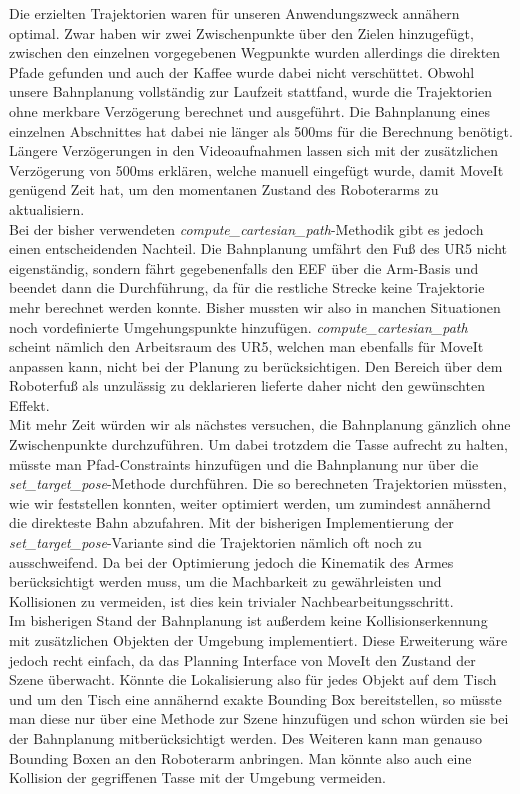 Die erzielten Trajektorien waren für unseren Anwendungszweck annähern optimal. Zwar haben wir zwei Zwischenpunkte über den Zielen hinzugefügt, zwischen den einzelnen vorgegebenen Wegpunkte wurden allerdings die direkten Pfade gefunden und auch der Kaffee wurde dabei nicht verschüttet.
\newline
Obwohl unsere Bahnplanung vollständig zur Laufzeit stattfand, wurde die Trajektorien ohne merkbare Verzögerung berechnet und ausgeführt. Die Bahnplanung eines einzelnen Abschnittes hat dabei nie länger als 500ms für die Berechnung benötigt. Längere Verzögerungen in den Videoaufnahmen lassen sich mit der zusätzlichen Verzögerung von 500ms erklären, welche manuell eingefügt wurde, damit MoveIt genügend Zeit hat, um den momentanen Zustand des Roboterarms zu aktualisiern.
\newline \\
Bei der bisher verwendeten \textit{compute\_cartesian\_path}-Methodik gibt es jedoch einen entscheidenden Nachteil. Die Bahnplanung umfährt den Fuß des UR5 nicht eigenständig, sondern fährt gegebenenfalls den EEF über die Arm-Basis und beendet dann die Durchführung, da für die restliche Strecke keine Trajektorie mehr berechnet werden konnte. Bisher mussten wir also in manchen Situationen noch vordefinierte Umgehungspunkte hinzufügen. \textit{compute\_cartesian\_path} scheint nämlich den Arbeitsraum des UR5, welchen man ebenfalls für MoveIt anpassen kann, nicht bei der Planung zu berücksichtigen. Den Bereich über dem Roboterfuß als unzulässig zu deklarieren lieferte daher nicht den gewünschten Effekt.
\newline \\
Mit mehr Zeit würden wir als nächstes versuchen, die Bahnplanung gänzlich ohne Zwischenpunkte durchzuführen. Um dabei trotzdem die Tasse aufrecht zu halten, müsste man Pfad-Constraints hinzufügen und die Bahnplanung nur über die \textit{set\_target\_pose}-Methode durchführen.
\newline
Die so berechneten Trajektorien müssten, wie wir feststellen konnten, weiter optimiert werden, um zumindest annähernd die direkteste Bahn abzufahren. Mit der bisherigen Implementierung der \textit{set\_target\_pose}-Variante sind die Trajektorien nämlich oft noch zu ausschweifend. Da bei der Optimierung jedoch die Kinematik des Armes berücksichtigt werden muss, um die Machbarkeit zu gewährleisten und Kollisionen zu vermeiden, ist dies kein trivialer Nachbearbeitungsschritt.
\newline \\
Im bisherigen Stand der Bahnplanung ist außerdem keine Kollisionserkennung mit zusätzlichen Objekten der Umgebung implementiert. Diese Erweiterung wäre jedoch recht einfach, da das Planning Interface von MoveIt den Zustand der Szene überwacht. Könnte die Lokalisierung also für jedes Objekt auf dem Tisch und um den Tisch eine annähernd exakte Bounding Box bereitstellen, so müsste man diese nur über eine Methode zur Szene hinzufügen und schon würden sie bei der Bahnplanung mitberücksichtigt werden. Des Weiteren kann man genauso Bounding Boxen an den Roboterarm anbringen. Man könnte also auch eine Kollision der gegriffenen Tasse mit der Umgebung vermeiden.